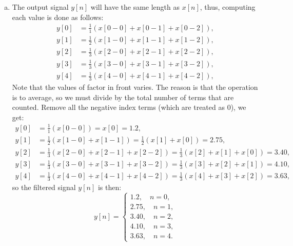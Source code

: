 \begin{enumerate}
        \begin{enumerate}[a)]
          \item The output signal $y[n]$ will have the same length as $x[n]$, thus, computing each value
                is done as follows:
                \begin{align*}
                  y[0] & = \frac{1}{1}(x[0 - 0] + x[0 - 1] + x[0 - 2]), \\
                  y[1] & = \frac{1}{2}(x[1 - 0] + x[1 - 1] + x[1 - 2]), \\
                  y[2] & = \frac{1}{3}(x[2 - 0] + x[2 - 1] + x[2 - 2]), \\
                  y[3] & = \frac{1}{3}(x[3 - 0] + x[3 - 1] + x[3 - 2]), \\
                  y[4] & = \frac{1}{3}(x[4 - 0] + x[4 - 1] + x[4 - 2]),
                \end{align*}
                Note that the values of factor in front varies. The reason is that the operation is to average,
                so we must divide by the total number of terms that are counted. Remove all the negative index
                terms (which are treated as 0), we get:
                \begin{align*}
                  y[0] & = \frac{1}{1}(x[0 - 0]) = x[0] = 1.2,                                                   \\
                  y[1] & = \frac{1}{2}(x[1 - 0] + x[1 - 1]) = \frac{1}{2}(x[1] + x[0]) = 2.75,                   \\
                  y[2] & = \frac{1}{3}(x[2 - 0] + x[2 - 1] + x[2 - 2]) = \frac{1}{3}(x[2] + x[1] + x[0]) = 3.40, \\
                  y[3] & = \frac{1}{3}(x[3 - 0] + x[3 - 1] + x[3 - 2]) = \frac{1}{3}(x[3] + x[2] + x[1]) = 4.10, \\
                  y[4] & = \frac{1}{3}(x[4 - 0] + x[4 - 1] + x[4 - 2]) = \frac{1}{3}(x[4] + x[3] + x[2]) = 3.63,
                \end{align*}
                so the filtered signal $y[n]$ is then:
                \[
                  y[n] = \begin{cases}
                    1.2, \quad n = 0,  \\
                    2.75, \quad n = 1, \\
                    3.40, \quad n = 2, \\
                    4.10, \quad n = 3, \\
                    3.63, \quad n = 4.
                  \end{cases}
                \]


\end{enumerate}
\end{enumerate}
